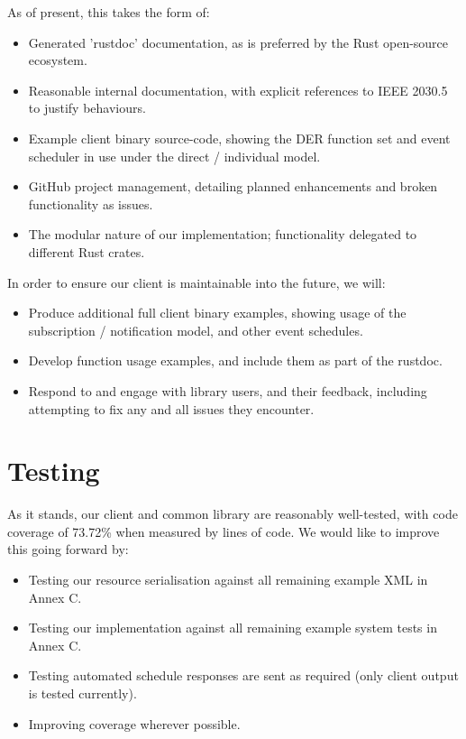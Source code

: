 As of present, this takes the form of:

\begin{itemize}
    \item Generated 'rustdoc' documentation, as is preferred by the Rust open-source ecosystem.
    \item Reasonable internal documentation, with explicit references to IEEE 2030.5 to justify behaviours.
    \item Example client binary source-code, showing the DER function set and event scheduler in use under the direct / individual model.
    \item GitHub project management, detailing planned enhancements and broken functionality as issues.
    \item The modular nature of our implementation; functionality delegated to different Rust crates.
\end{itemize}

In order to ensure our client is maintainable into the future, we will:

\begin{itemize}
    \item Produce additional full client binary examples, showing usage of the subscription / notification model, and other event schedules.
    \item Develop function usage examples, and include them as part of the rustdoc.
    \item Respond to and engage with library users, and their feedback, including attempting to fix any and all issues they encounter.
\end{itemize}

\section{Testing}
As it stands, our client and common library are reasonably well-tested, with code coverage of 73.72\% when measured by lines of code. We would like to improve this going forward by:

\begin{itemize}
	\item Testing our resource serialisation against all remaining example XML in Annex C.
	\item Testing our implementation against all remaining example system tests in Annex C.
	\item Testing automated schedule responses are sent as required (only client output is tested currently).
	\item Improving coverage wherever possible.
\end{itemize}

